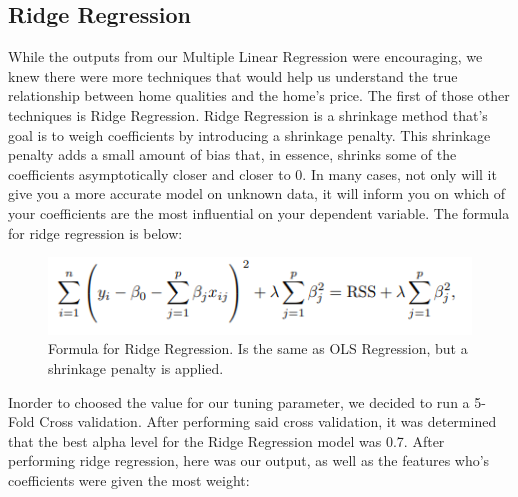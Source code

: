 \documentclass{article}
\begin{document}
	\subsection{Ridge Regression}

	While the outputs from our Multiple Linear Regression were encouraging, we knew there were more techniques that would help us understand the true relationship between home qualities and the home's price. The first of those other techniques is Ridge Regression.
	Ridge Regression is a shrinkage method that's goal is to weigh coefficients by introducing a shrinkage penalty. This shrinkage penalty adds a small amount of bias that, in essence, shrinks some of the coefficients asymptotically closer and closer to 0. In many cases, not only will it give you a more accurate model on unknown data, it will inform you on which of your coefficients are the most influential on your dependent variable. The formula for ridge regression is below:

	\begin{figure}
		\includegraphics[width=\textwidth]{ridgeform}
		\caption{Formula for Ridge Regression. Is the same as OLS Regression, but a shrinkage penalty is applied.}
		\label{fig:skew}
	\end{figure}

	Inorder to choosed the value for our tuning parameter, we decided to run a 5-Fold Cross validation. After performing said cross validation, it was determined that the best alpha level for the Ridge Regression model was 0.7. After performing ridge regression, here was our output, as well as the features who's coefficients were given the most weight:

\end{document}

